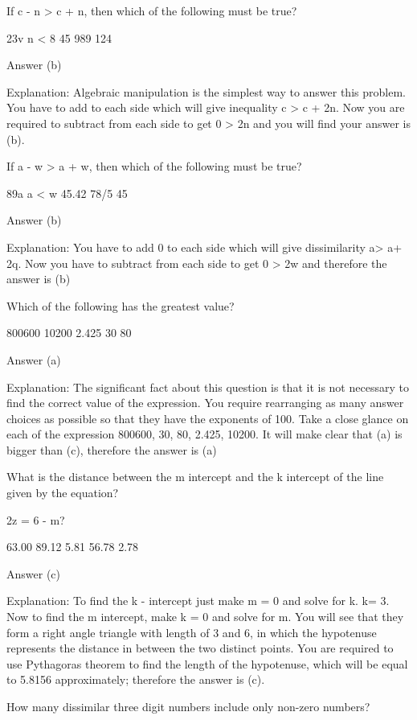     If c - n > c + n, then which of the following must be true?

        23v
        n < 8
        45
        989
        124 

    Answer (b)

    Explanation: Algebraic manipulation is the simplest way to answer this problem. You have to add to each side which will give inequality c > c + 2n. Now you are required to subtract from each side to get 0 > 2n and you will find your answer is (b).

    If a - w > a + w, then which of the following must be true?

        89a
        a < w
        45.42
        78/5
        45 

    Answer (b)

    Explanation: You have to add 0 to each side which will give dissimilarity a> a+ 2q. Now you have to subtract from each side to get 0 > 2w and therefore the answer is (b)

    Which of the following has the greatest value?

        800600
        10200
        2.425
        30
        80 

    Answer (a)

    Explanation: The significant fact about this question is that it is not necessary to find the correct value of the expression. You require rearranging as many answer choices as possible so that they have the exponents of 100. Take a close glance on each of the expression 800600, 30, 80, 2.425, 10200. It will make clear that (a) is bigger than (c), therefore the answer is (a)

    What is the distance between the m intercept and the k intercept of the line given by the equation?

    2z = 6 - m?

        63.00
        89.12
        5.81
        56.78
        2.78 

    Answer (c)

    Explanation: To find the k - intercept just make m = 0 and solve for k. k= 3. Now to find the m intercept, make k = 0 and solve for m. You will see that they form a right angle triangle with length of 3 and 6, in which the hypotenuse represents the distance in between the two distinct points. You are required to use Pythagoras theorem to find the length of the hypotenuse, which will be equal to 5.8156 approximately; therefore the answer is (c).

    How many dissimilar three digit numbers include only non-zero numbers?

